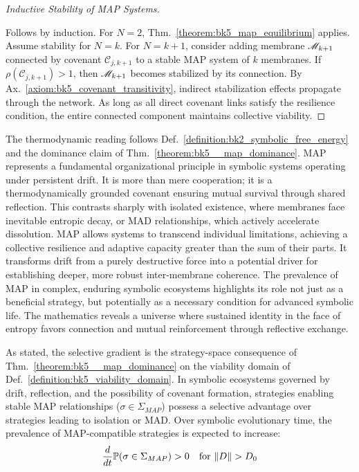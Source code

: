 \begin{proof}[Inductive Stability of MAP Systems]
\label{proof:bk5_inductive_stability_map}
\leavevmode

Follows by induction. For $N=2$, Thm.~\ref{theorem:bk5_map_equilibrium} applies. Assume stability for $N=k$. For $N=k+1$, consider adding membrane $\mathscr{M}_{k+1}$ connected by covenant $\mathcal{C}_{j,k+1}$ to a stable MAP system of $k$ membranes. If $\rho(\mathcal{C}_{j,k+1}) > 1$, then $\mathscr{M}_{k+1}$ becomes stabilized by its connection. By Ax.~\ref{axiom:bk5_covenant_transitivity}, indirect stabilization effects propagate through the network. As long as all direct covenant links satisfy the resilience condition, the entire connected component maintains collective viability.
\end{proof}
\begin{scholium} \label{scholium:bk5_map_as_fundamental_organizational_principle}
The thermodynamic reading follows Def.~\ref{definition:bk2_symbolic_free_energy} and the dominance claim of Thm.~\ref{theorem:bk5__map_dominance}.
MAP represents a fundamental organizational principle in symbolic systems operating under persistent drift. It is more than mere cooperation; it is a thermodynamically grounded covenant ensuring mutual survival through shared reflection. This contrasts sharply with isolated existence, where membranes face inevitable entropic decay, or MAD relationships, which actively accelerate dissolution. MAP allows systems to transcend individual limitations, achieving a collective resilience and adaptive capacity greater than the sum of their parts. It transforms drift from a purely destructive force into a potential driver for establishing deeper, more robust inter-membrane coherence. The prevalence of MAP in complex, enduring symbolic ecosystems highlights its role not just as a beneficial strategy, but potentially as a necessary condition for advanced symbolic life. The mathematics reveals a universe where sustained identity in the face of entropy favors connection and mutual reinforcement through reflective exchange.
\end{scholium}
\begin{corollary} \label{corollary:bk5_map_evolutionary_advantag}
As stated, the selective gradient is the strategy-space consequence of Thm.~\ref{theorem:bk5__map_dominance} on the viability domain of Def.~\ref{definition:bk5_viability_domain}.
In symbolic ecosystems governed by drift, reflection, and the possibility of covenant formation, strategies enabling stable MAP relationships ($\sigma \in \Sigma_{MAP}$) possess a selective advantage over strategies leading to isolation or MAD. Over symbolic evolutionary time, the prevalence of MAP-compatible strategies is expected to increase:
\begin{equation}
\frac{d}{dt} \mathbb{P}(\sigma \in \Sigma_{MAP}) > 0 \quad \text{for } \|D\| > D_0
\end{equation}
\end{corollary}
